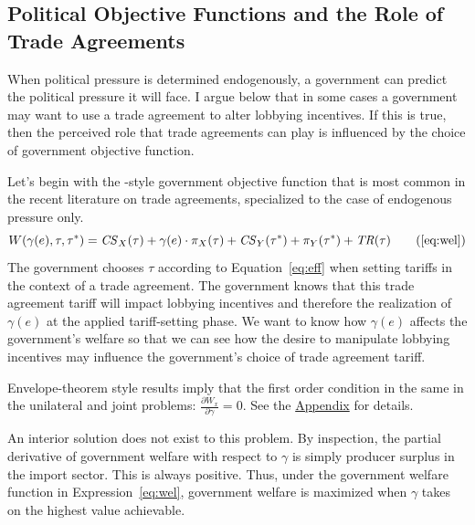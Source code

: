 \documentclass[12pt]{article}
\newtheorem{assumption}{Assumption}
\newcommand{\ga}{\gamma}
\begin{document}



\subsection{Political Objective Functions and the Role of Trade Agreements}
\label{sec:objfcn}
When political pressure is determined endogenously, a government can predict the political pressure it will face. I argue below that in some cases a government may want to use a trade agreement to alter lobbying incentives. If this is true, then the perceived role that trade agreements can play is influenced by the choice of government objective function.

Let's begin with the \Textcite{baldwin}-style government objective function that is most common in the recent literature on trade agreements, specialized to the case of endogenous pressure only.
\begin{equation}
  W(\ga(e),\tau,\tau^*) = \mathit{CS}_X(\tau) + \ga(e) \cdot \pi_X(\tau) + \mathit{CS}_Y(\tau^*) + \pi_Y(\tau^*) + \mathit{TR}(\tau)
  \tag{\ref{eq:wel}}
\end{equation}
The government chooses $\tau$ according to Equation~\ref{eq:eff} when setting tariffs in the context of a trade agreement. The government knows that this trade agreement tariff will impact lobbying incentives and therefore the realization of $\ga(e)$ at the applied tariff-setting phase. We want to know how $\ga(e)$ affects the government's welfare so that we can see how the desire to manipulate lobbying incentives may influence the government's choice of trade agreement tariff.

Envelope-theorem style results imply that the first order condition in the same in the unilateral and joint problems: $\displaystyle \frac{\partial W_x}{\partial \ga} = 0$. See the \hyperlink{envelope}{Appendix} for details.

An interior solution does not exist to this problem. By inspection, the partial derivative of government welfare with respect to $\ga$ is simply producer surplus in the import sector. This is always positive. Thus, under the government welfare function in Expression~\ref{eq:wel}, government welfare is maximized when $\ga$ takes on the highest value achievable.
\end{document}
